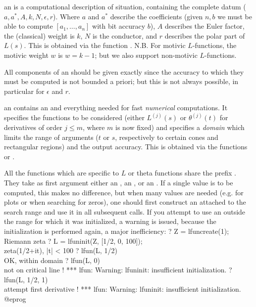 \item an  is a computational description of situation, containing
the complete datum ($a,a^*,A,k,N,\epsilon,r$). Where $a$ and $a^*$ describe
the coefficients (given $n,b$ we must be able to compute $[a_1,\dots,a_n]$
with bit accuracy $b$), $A$ describes the Euler factor, the (classical) weight
is $k$, $N$ is the conductor, and $r$ describes the polar part of $L(s)$.
This is obtained via the function . N.B. For motivic
$L$-functions, the motivic weight $w$ is $w = k-1$; but we also support
non-motivic $L$-functions.

 All components of an  should be given
exactly since the accuracy to which they must be computed is not bounded a
priori; but this is not always possible, in particular for $\epsilon$ and $r$.

\item an  contains an  and everything needed for fast
\emph{numerical} computations. It specifies the functions to be considered
(either $L^{(j)}(s)$ or $\theta^{(j)}(t)$ for derivatives of order $j \leq
m$, where $m$ is now fixed) and specifies a \emph{domain} which limits
the range of arguments ($t$ or $s$, respectively to certain cones and
rectangular regions) and the output accuracy. This is obtained via the
functions  or .

All the functions which are specific to $L$ or theta functions share the
prefix . They take as first argument either an , an
, or an . If a single value is to be computed,
this makes no difference, but when many values are needed (e.g. for plots or
when searching for zeros), one should first construct an 
attached to the search range and use it in all subsequent calls.
If you attempt to use an  outside the range for which it was
initialized, a warning is issued, because the initialization is
performed again, a major inefficiency:
\bprog
? Z = lfuncreate(1); \\ Riemann zeta
? L = lfuninit(Z, [1/2, 0, 100]); \\ zeta(1/2+it), |t| < 100
? lfun(L, 1/2)    \\ OK, within domain
? lfun(L, 0)      \\ not on critical line !
  *** lfun: Warning: lfuninit: insufficient initialization.
? lfun(L, 1/2, 1) \\ attempt first derivative !
*** lfun: Warning: lfuninit: insufficient initialization.
@eprog

